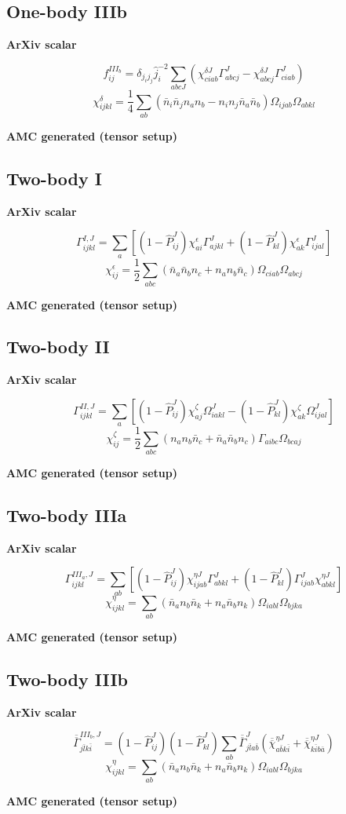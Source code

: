 \documentclass[11pt]{article}
\newcommand{\CompareBlock}[3]{%
\subsection*{#1}
\noindent
\begin{minipage}[t]{0.48\textwidth}
\textbf{ArXiv scalar}
#2
\end{minipage}\hfill
\begin{minipage}[t]{0.48\textwidth}
\textbf{AMC generated (tensor setup)}

\end{minipage}
\vspace{1em}
}
\begin{document}
\CompareBlock{One-body IIIb}{
\begin{equation*}
 f^{III_b}_{ij}=\delta_{j_i j_j}\hat j_i^{-2}\sum_{abcJ}
\left(\chi^{\delta J}_{ciab}\Gamma^J_{abcj}-\chi^{\delta J}_{abcj}\Gamma^J_{ciab}\right)
\end{equation*}
\begin{equation*}
 \chi^{\delta}_{ijkl}=\frac14\sum_{ab}\left(\bar n_i\bar n_j n_a n_b-n_i n_j\bar n_a\bar n_b\right)\Omega_{ijab}\Omega_{abkl}
\end{equation*}
}{amc_eq_snippets_clean/dc_f3b_tensor_clean_body.tex}

\CompareBlock{Two-body I}{
\begin{equation*}
\Gamma^{I,J}_{ijkl}=\sum_a\left[(1-\hat P^J_{ij})\chi^{\epsilon}_{ai}\Gamma^J_{ajkl}+(1-\hat P^J_{kl})\chi^{\epsilon}_{ak}\Gamma^J_{ijal}\right]
\end{equation*}
\begin{equation*}
 \chi^{\epsilon}_{ij}=\frac12\sum_{abc}\left(\bar n_a\bar n_b n_c+n_a n_b\bar n_c\right)\Omega_{ciab}\Omega_{abcj}
\end{equation*}
}{amc_eq_snippets_clean/dc_G1_tensor_clean_body.tex}

\CompareBlock{Two-body II}{
\begin{equation*}
\Gamma^{II,J}_{ijkl}=\sum_a\left[(1-\hat P^J_{ij})\chi^{\zeta}_{aj}\Omega^J_{iakl}-(1-\hat P^J_{kl})\chi^{\zeta}_{ak}\Omega^J_{ijal}\right]
\end{equation*}
\begin{equation*}
 \chi^{\zeta}_{ij}=\frac12\sum_{abc}\left(n_a n_b\bar n_c+\bar n_a\bar n_b n_c\right)\Gamma_{aibc}\Omega_{bcaj}
\end{equation*}
}{amc_eq_snippets_clean/dc_G2_chizeta_tensor_only_body.tex}

\CompareBlock{Two-body IIIa}{
\begin{equation*}
\Gamma^{III_a,J}_{ijkl}=\sum_{ab}\left[(1-\hat P^J_{ij})\chi^{\eta J}_{ijab}\Gamma^J_{abkl}+(1-\hat P^J_{kl})\Gamma^J_{ijab}\chi^{\eta J}_{abkl}\right]
\end{equation*}
\begin{equation*}
 \chi^{\eta}_{ijkl}=\sum_{ab}\left(\bar n_a n_b\bar n_k+n_a\bar n_b n_k\right)\Omega_{iabl}\Omega_{bjka}
\end{equation*}
}{amc_eq_snippets_clean/dc_G3a_tensor_clean_body.tex}

\CompareBlock{Two-body IIIb}{
\begin{equation*}
\overline{\overline\Gamma}^{III_b,J}_{j\bar l k\bar i}=(1-\hat P^J_{ij})(1-\hat P^J_{kl})\sum_{ab}\overline{\overline\Gamma}^J_{j\bar l a\bar b}\left(\overline{\overline\chi}^{\eta J}_{a\bar b k\bar i}+\overline{\overline\chi}^{\eta J}_{k\bar i b\bar a}\right)
\end{equation*}
\begin{equation*}
 \chi^{\eta}_{ijkl}=\sum_{ab}\left(\bar n_a n_b\bar n_k+n_a\bar n_b n_k\right)\Omega_{iabl}\Omega_{bjka}
\end{equation*}
}{amc_eq_snippets_clean/dc_G3b_tensor_clean_body.tex}
\end{document}
